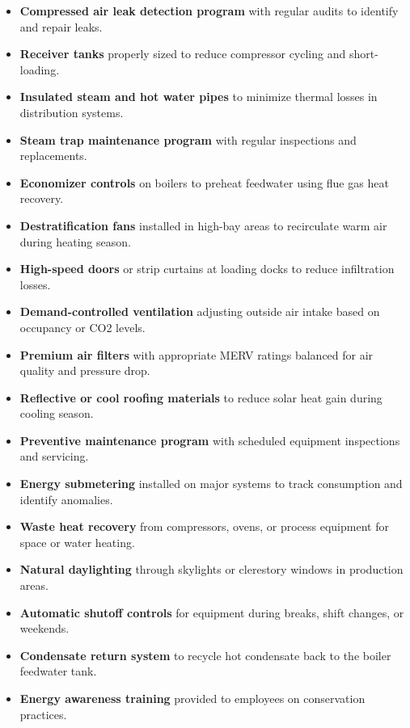 \begin{itemize}
        \item \textbf{Compressed air leak detection program} with regular audits to identify and repair leaks.
        \item \textbf{Receiver tanks} properly sized to reduce compressor cycling and short-loading.
        \item \textbf{Insulated steam and hot water pipes} to minimize thermal losses in distribution systems.
        \item \textbf{Steam trap maintenance program} with regular inspections and replacements.
        \item \textbf{Economizer controls} on boilers to preheat feedwater using flue gas heat recovery.
        \item \textbf{Destratification fans} installed in high-bay areas to recirculate warm air during heating season.
        \item \textbf{High-speed doors} or strip curtains at loading docks to reduce infiltration losses.
        \item \textbf{Demand-controlled ventilation} adjusting outside air intake based on occupancy or CO2 levels.
        \item \textbf{Premium air filters} with appropriate MERV ratings balanced for air quality and pressure drop.
        \item \textbf{Reflective or cool roofing materials} to reduce solar heat gain during cooling season.
        \item \textbf{Preventive maintenance program} with scheduled equipment inspections and servicing.
        \item \textbf{Energy submetering} installed on major systems to track consumption and identify anomalies.
        \item \textbf{Waste heat recovery} from compressors, ovens, or process equipment for space or water heating.
        \item \textbf{Natural daylighting} through skylights or clerestory windows in production areas.
        \item \textbf{Automatic shutoff controls} for equipment during breaks, shift changes, or weekends.
        \item \textbf{Condensate return system} to recycle hot condensate back to the boiler feedwater tank.
        \item \textbf{Energy awareness training} provided to employees on conservation practices.
    \end{itemize}
